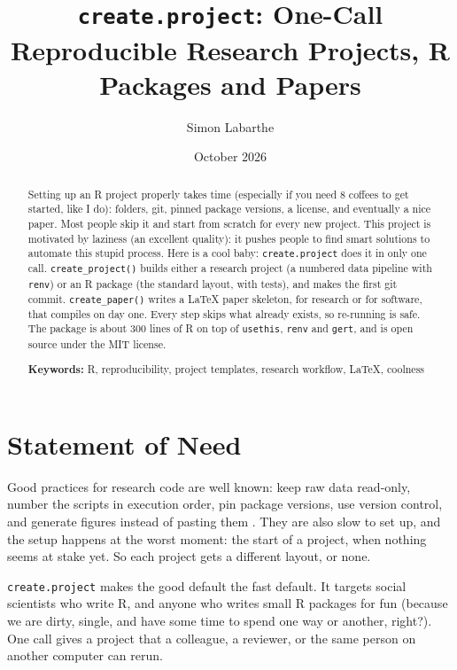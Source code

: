 \documentclass[11pt,a4paper]{article}
\title{\textbf{\texttt{create.project}: One-Call Reproducible Research Projects, R Packages and Papers}}
\author{Simon Labarthe}
\date{October 2026}
\begin{document}
\maketitle

\begin{abstract}
Setting up an R project properly takes time (especially if you need 8 coffees to get started, like I do): folders, git, pinned package versions, a license, and eventually a nice paper. Most people skip it and start from scratch for every new project. This project is motivated by laziness (an excellent quality): it pushes people to find smart solutions to automate this stupid process. Here is a cool baby: \texttt{create.project} does it in only one call. \texttt{create\_project()} builds either a research project (a numbered data pipeline with \texttt{renv}) or an R package (the standard layout, with tests), and makes the first git commit. \texttt{create\_paper()} writes a LaTeX paper skeleton, for research or for software, that compiles on day one. Every step skips what already exists, so re-running is safe. The package is about 300 lines of R on top of \texttt{usethis}, \texttt{renv} and \texttt{gert}, and is open source under the MIT license.

\medskip
\noindent\textbf{Keywords:} R, reproducibility, project templates, research workflow, LaTeX, coolness
\end{abstract}

\section{Statement of Need}\label{sec:need}

Good practices for research code are well known: keep raw data read-only, number the scripts in execution order, pin package versions, use version control, and generate figures instead of pasting them \citep{wilson2017, marwick2018}. They are also slow to set up, and the setup happens at the worst moment: the start of a project, when nothing seems at stake yet. So each project gets a different layout, or none.

\texttt{create.project} makes the good default the fast default. It targets social scientists who write R, and anyone who writes small R packages for fun (because we are dirty, single, and have some time to spend one way or another, right?). One call gives a project that a colleague, a reviewer, or the same person on another computer can rerun.
\end{document}
